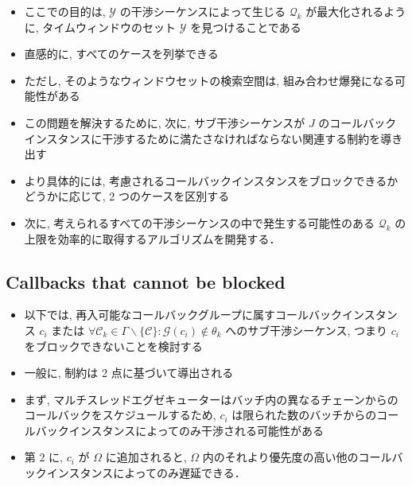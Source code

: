 \begin{frame}{}
    \begin{itemize}
        \item ここでの目的は, $\mathcal{Y}$ の干渉シーケンスによって生じる $\mathcal{Q}_{k}$ が最大化されるように, タイムウィンドウのセット $\mathcal{Y}$ を見つけることである
        \item 直感的に, すべてのケースを列挙できる
        \item ただし, そのようなウィンドウセットの検索空間は, 組み合わせ爆発になる可能性がある
        \item この問題を解決するために, 次に, サブ干渉シーケンスが $J$ のコールバックインスタンスに干渉するために満たさなければならない関連する制約を導き出す
        \item より具体的には, 考慮されるコールバックインスタンスをブロックできるかどうかに応じて, 2 つのケースを区別する
        \item 次に, 考えられるすべての干渉シーケンスの中で発生する可能性のある $\mathcal{Q}_{k}$ の上限を効率的に取得するアルゴリズムを開発する．
    \end{itemize}
\end{frame}


\subsection{Callbacks that cannot be blocked}
\label{ssec: callbacks_that_cannot_be_blocked}

\begin{frame}{}
    \begin{itemize}
        \item 以下では, 再入可能なコールバックグループに属すコールバックインスタンス $c_{i}$ または $\forall \mathcal{C}_{k} \in \Gamma \backslash\{\mathcal{C}\}: \mathcal{G}\left(c_{i}\right) \notin \theta_{k}$ へのサブ干渉シーケンス, つまり $c_{i}$ をブロックできないことを検討する
        \item 一般に, 制約は 2 点に基づいて導出される
        \item まず, マルチスレッドエグゼキューターはバッチ内の異なるチェーンからのコールバックをスケジュールするため, $c_{i}$ は限られた数のバッチからのコールバックインスタンスによってのみ干渉される可能性がある
        \item 第 2 に, $c_{i}$ が $\Omega$ に追加されると, $\Omega$ 内のそれより優先度の高い他のコールバックインスタンスによってのみ遅延できる．
    \end{itemize}
\end{frame}


